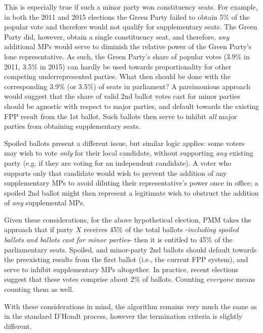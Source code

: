 This is especially true if such a minor party won constituency seats. For example, in both the 2011 and 2015 elections the Green Party failed to obtain 5\% of the popular vote and therefore would not qualify for supplementary seats. The Green Party did, however, obtain a single constituency seat, and therefore, \emph{any} additional MPs would serve to diminish the relative power of the Green Party's lone representative.
As such, the Green Party’s share of popular votes (3.9\% in 2011, 3.5\% in 2015) can hardly be used towards proportionality for other competing underrepresented parties. What then should be done with the corresponding 3.9\% (or 3.5\%) of seats in parliament? 
A parsimonious approach would suggest that the share of valid 2nd ballot votes cast for minor parties should be agnostic with respect to major parties, and default towards the existing FPP result from the 1st ballot. Such ballots then serve to inhibit \emph{all} major parties from obtaining supplementary seats.

Spoiled ballots present a different issue, but similar logic applies: some voters may wish to vote \emph{only} for their local candidate, without supporting \emph{any} existing party (e.g. if they are voting for an independent candidate).
A voter who supports only that candidate would wish to prevent the addition of any supplementary MPs to avoid diluting their representative's power once in office; a spoiled 2nd ballot might then represent a legitimate wish to obstruct the addition of \emph{any} supplemental MPs.

Given these considerations, for the above hypothetical election, PMM takes the approach that if party $X$ receives 45\% of the total ballots \--\emph{including spoiled ballots and ballots cast for minor parties}\-- then it is entitled to 45\% of the parliamentary seats.
Spoiled, and minor-party 2nd ballots should default towards the preexisting results from the first ballot (i.e., the current FPP system), and serve to inhibit supplementary MPs altogether.
In practice, recent elections suggest that these votes comprise about 2\% of ballots. Counting \emph{everyone} means counting them as well.

With these considerations in mind, the algorithm remains very much the same as in the standard D'Hondt process, however the termination criteria is slightly different.

